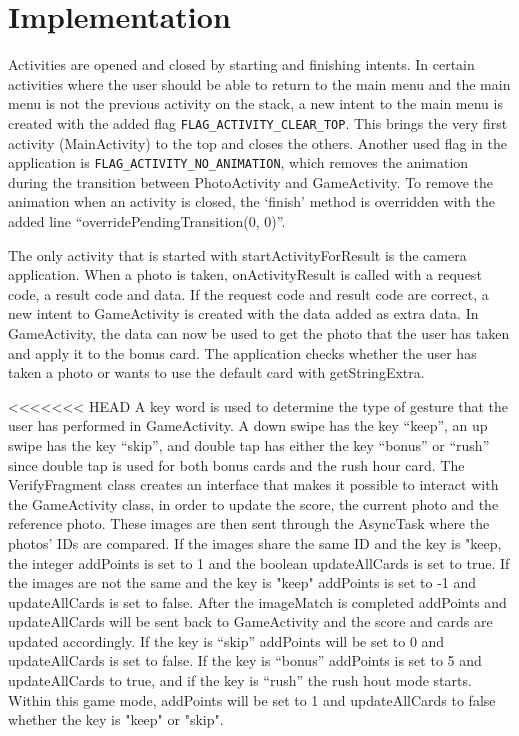 \section{Implementation}
Activities are opened and closed by starting and finishing intents. In certain activities where the user should be able to return to the main menu and the main menu is not the previous activity on the stack, a new intent to the main menu is created with the added flag \verb|FLAG_ACTIVITY_CLEAR_TOP|. This brings the very first activity (MainActivity) to the top and closes the others. Another used flag in the application is \verb|FLAG_ACTIVITY_NO_ANIMATION|, which removes the animation during the transition between PhotoActivity and GameActivity. To remove the animation when an activity is closed, the ‘finish’ method is overridden with the added line “overridePendingTransition(0, 0)”. \newline

The only activity that is started with startActivityForResult is the camera application. When a photo is taken, onActivityResult is called with a request code, a result code and data. If the request code and result code are correct, a new intent to GameActivity is created with the data added as extra data. In GameActivity, the data can now be used to get the photo that the user has taken and apply it to the bonus card. The application checks whether the user has taken a photo or wants to use the default card with getStringExtra. \newline

<<<<<<< HEAD
A key word is used to determine the type of gesture that the user has performed in GameActivity. A down swipe has the key “keep”, an up swipe has the key “skip”, and double tap has either the key “bonus” or “rush” since double tap is used for both bonus cards and the rush hour card.  The VerifyFragment class creates an interface that makes it possible to interact with the GameActivity class, in order to update the score, the current photo and the reference photo. These images are then sent through the AsyncTask where the photos' IDs are compared. If the images share the same ID and the key is "keep, the integer addPoints is set to 1 and the boolean updateAllCards is set to true. If the images are not the same and the key is "keep" addPoints is set to -1 and updateAllCards is set to false. After the imageMatch is completed addPoints and updateAllCards will be sent back to GameActivity and the score and cards are updated accordingly. If the key is “skip” addPoints will be set to 0 and updateAllCards is set to false. If the key is “bonus” addPoints is set to 5 and updateAllCards to true, and if the key is “rush” the rush hout mode starts. Within this game mode, addPoints will be set to 1 and updateAllCards to false whether the key is "keep" or "skip". \newline

